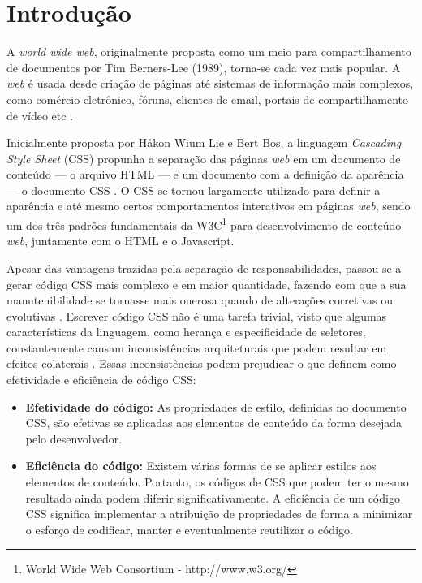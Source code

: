 \chapter{Introdução}
\label{chap:Intr}
A \textit{world wide web}, originalmente proposta como um meio para compartilhamento de documentos por Tim Berners-Lee (1989), torna-se cada vez mais popular. A \textit{web} é usada desde criação de páginas até sistemas de informação mais complexos, como comércio eletrônico, fóruns, clientes de email, portais de compartilhamento de vídeo etc \cite{Berners-Lee:2000:WWO:556560}.

Inicialmente proposta por Håkon Wium Lie e Bert Bos, a linguagem \textit{Cascading Style Sheet} (CSS) propunha a separação das páginas \textit{web} em um documento de conteúdo --- o arquivo HTML --- e um documento com a definição da aparência --- o documento CSS \cite{Hakon:2005}. O CSS se tornou largamente utilizado para definir a aparência e até mesmo certos comportamentos interativos em páginas \textit{web}, sendo um dos três padrões fundamentais da W3C\footnote{World Wide Web Consortium - http://www.w3.org/} para desenvolvimento de conteúdo \textit{web}, juntamente com o HTML e o Javascript.

Apesar das vantagens trazidas pela separação de responsabilidades, passou-se a gerar código CSS mais complexo e em maior quantidade, fazendo com que a sua manutenibilidade se tornasse mais onerosa quando de alterações corretivas ou evolutivas \cite{Mesbah2012}.
Escrever código CSS não é uma tarefa trivial, visto que algumas características da linguagem, como herança e especificidade de seletores, constantemente causam inconsistências arquiteturais que podem resultar em efeitos colaterais \cite{Walton:2015}.
Essas inconsistências podem prejudicar o que  definem como efetividade e eficiência de código CSS:

\begin{itemize}
	\item\textbf{Efetividade do código:} As propriedades de estilo, definidas no documento CSS, são efetivas se aplicadas aos elementos de conteúdo da forma desejada pelo desenvolvedor.
	
	\item\textbf{Eficiência do código:} Existem várias formas de se aplicar estilos aos elementos de conteúdo. Portanto, os códigos de CSS que podem ter o mesmo resultado ainda podem diferir significativamente. A eficiência de um código CSS significa implementar a atribuição de propriedades de forma a minimizar o esforço de codificar, manter e eventualmente reutilizar o código.
\end{itemize}

